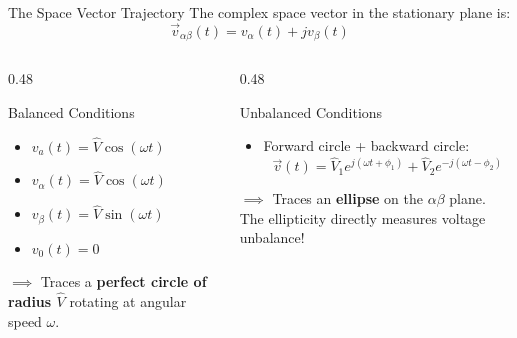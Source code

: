\begin{frame}[allowframebreaks]{The Space Vector Trajectory}
    The complex space vector in the stationary plane is:
    \begin{equation}
        \vec{v}_{\alpha\beta}(t) = v_\alpha(t) + j v_\beta(t)
    \end{equation}

    \begin{columns}
        \begin{column}{0.48\textwidth}
            \begin{block}{Balanced Conditions}
                \begin{itemize}
                    \item $v_a(t) = \hat{V} \cos(\omega t)$
                    \item $v_\alpha(t) = \hat{V} \cos(\omega t)$
                    \item $v_\beta(t) = \hat{V} \sin(\omega t)$
                    \item $v_0(t) = 0$
                \end{itemize}
                $\implies$ Traces a \alert{\textbf{perfect circle of radius $\hat{V}$}} rotating at angular speed $\omega$.
            \end{block}
        \end{column}

        \begin{column}{0.48\textwidth}
            \begin{alertblock}{Unbalanced Conditions}
                \begin{itemize}
                    \item Forward circle + backward circle:
                    \begin{equation*}
                        \vec{v}(t) = \hat{V}_1 e^{j(\omega t + \phi_1)} + \hat{V}_2 e^{-j(\omega t - \phi_2)}
                    \end{equation*}
                \end{itemize}
                $\implies$ Traces an \alert{\textbf{ellipse}} on the $\alpha\beta$ plane. The ellipticity directly measures voltage unbalance!
            \end{alertblock}
        \end{column}
    \end{columns}
\end{frame}

